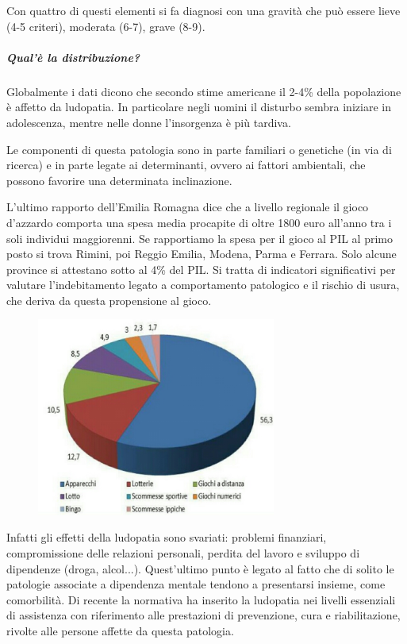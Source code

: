 Con quattro di questi elementi si fa diagnosi con una gravità che può
essere lieve (4-5 criteri), moderata (6-7), grave (8-9).
\subparagraph{Qual'è la distribuzione?}


Globalmente i dati dicono che secondo stime americane il 2-4\% della
popolazione è affetto da ludopatia. In particolare negli uomini il
disturbo sembra iniziare in adolescenza, mentre nelle donne l'insorgenza
è più tardiva.

Le componenti di questa patologia sono in parte familiari o genetiche
(in via di ricerca) e in parte legate ai determinanti, ovvero ai fattori
ambientali, che possono favorire una determinata inclinazione.

L'ultimo rapporto dell'Emilia Romagna dice che a livello regionale il
gioco d'azzardo comporta una spesa media procapite di oltre 1800 euro
all'anno tra i soli individui maggiorenni. Se rapportiamo la spesa per
il gioco al PIL al primo posto si trova Rimini, poi Reggio Emilia,
Modena, Parma e Ferrara. Solo alcune province si attestano sotto al 4\%
del PIL. Si tratta di indicatori significativi per valutare
l'indebitamento legato a comportamento patologico e il rischio di usura,
che deriva da questa propensione al gioco.

\begin{figure}[!ht]
\centering
	\includegraphics[width=0.7\textwidth]{18/image9.jpeg}
\end{figure}

Infatti gli effetti della ludopatia
sono svariati: problemi finanziari, compromissione delle relazioni
personali, perdita del lavoro e sviluppo di dipendenze (droga,
alcol...). Quest'ultimo punto è legato al fatto che di solito le
patologie associate a dipendenza mentale tendono a presentarsi insieme,
come comorbilità. Di recente la normativa ha inserito la ludopatia nei
livelli essenziali di assistenza con riferimento alle prestazioni di
prevenzione, cura e riabilitazione, rivolte alle persone affette da
questa patologia.

